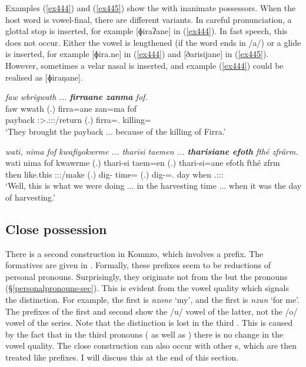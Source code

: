 Examples (\ref{ex444}) and (\ref{ex445}) show the   with inanimate possessors. When the host word is vowel-final, there are different variants. In careful pronunciation, a glottal stop is inserted, for example [ɸiraʔane] in (\ref{ex444}). In fast speech, this does not occur. Either the vowel is lengthened (if the word ends in /a/) or a glide is inserted, for example [ɸira.ne] in (\ref{ex444}) and [ðarisijane] in (\ref{ex445}). However, sometimes a velar nasal is inserted, and example (\ref{ex444}) could be realised as [ɸiraŋane]. 

\begin{exe}
	\ex \emph{faw wbrigwath ... \textbf{firraane zanma} fof.}\\
	\gll faw wwath (.) firra=ane zan=ma fof\\
	payback \Stpl:\Sbj>\Tsg.\F:\Obj:\Pst:\Ipfv/return (.) firra=\Poss.{\Sg} killing={\Char} \Emph\\
	\trans `They brought the payback ... because of the killing of Firra.'
	\label{ex444}
\end{exe}
\begin{exe}
	\ex \emph{wati, nima fof kwafiyokwrme ... tharisi taemen ... \textbf{tharisiane efoth} fthé zfrärm.}\\
	\gll wati nima fof kwawrme (.) thari-si taem=en (.) thari-si=ane efoth fthé zfrm\\
	then {like.this} {\Emph} \Fpl:\Sbj:\Pst:\Dur/make (.) dig-{\Nmlz} time={\Loc} (.) dig-\Nmlz=\Poss.{\Sg} day when \Tsg.\F:\Sbj:\Pst:\Dur{}\\
	\trans `Well, this is what we were doing ... in the harvesting time ... when it was the day of harvesting.'
	\label{ex445}
\end{exe}

\subsection{Close possession} \label{closeposs}

There is a second  construction in Komnzo, which involves a prefix. The formatives are given in . Formally, these prefixes seem to be reductions of personal pronouns. Surprisingly, they originate not from the  but the  pronouns ({\S}\ref{personalpronouns-sec}). This is evident from the vowel quality which signals the  distinction. For example, the first     is \emph{nzone} `my', and the first    is \emph{nzun} `for me'. The  prefixes of the first and second  show the /u/ vowel of the latter, not the /o/ vowel of the  series. Note that the  distinction is lost in the third . This is caused by the fact that in the third  pronouns ( as well as ) there is no change in the vowel quality. The close  construction can also occur with other s, which are then treated like prefixes. I will discuss this at the end of this section.

